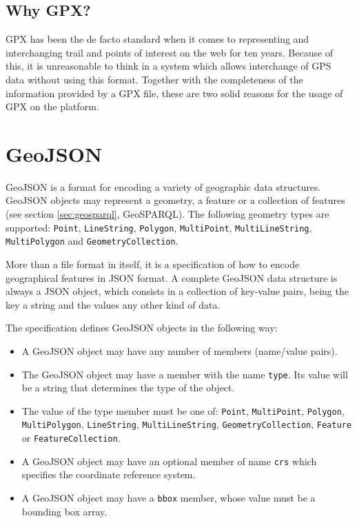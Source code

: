 \subsection*{Why GPX?}

GPX has been the de facto standard when it comes to representing and interchanging trail and points of interest on the web for ten years. Because of this, it is unreasonable to think in a system which allows interchange of GPS data without using this format. Together with the completeness of the information provided by a GPX file, these are two solid reasons for the usage of GPX on the platform.

\section{GeoJSON}\label{sec:geojson}

GeoJSON is a format for encoding a variety of geographic data structures\cite{geojson}. GeoJSON objects may represent a geometry, a feature or a collection of features (see section \ref{sec:geosparql}, GeoSPARQL). The following geometry types are supported: \texttt{Point}, \texttt{LineString}, \texttt{Polygon}, \texttt{MultiPoint}, \texttt{MultiLineString}, \texttt{MultiPolygon} and \texttt{GeometryCollection}.

More than a file format in itself, it is a specification of how to encode geographical features in JSON format. A complete GeoJSON data structure is always a JSON object, which consists in a collection of key-value pairs, being the key a string and the values any other kind of data.

The specification defines GeoJSON objects in the following way:

\begin{itemize}
\item A GeoJSON object may have any number of members (name/value pairs).
\item The GeoJSON object may have a member with the name \texttt{type}. Its value will be a string that determines the type of the object.
\item The value of the type member must be one of: \texttt{Point}, \texttt{MultiPoint}, \texttt{Polygon}, \texttt{MultiPolygon}, \texttt{LineString}, \texttt{MultiLineString}, \texttt{GeometryCollection}, \texttt{Feature} or \texttt{FeatureCollection}.
\item A GeoJSON object may have an optional member of name \texttt{crs} which specifies the coordinate reference system.
\item A GeoJSON object may have a \texttt{bbox} member, whose value must be a bounding box array.
\end{itemize}

